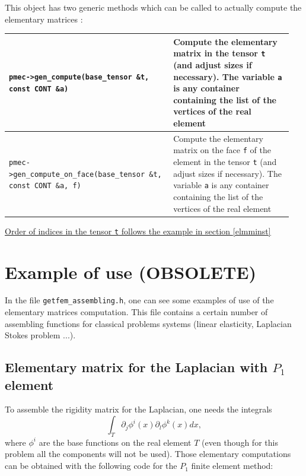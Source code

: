\documentclass[11pt,a4paper]{article}
\begin{document}
This object has two generic methods which can be called to actually compute the elementary matrices :

\begin{center} \begin{tabular}{|m{0.55\linewidth}|m{0.4\linewidth}|} \hline
{\tt pmec->gen\_compute(base\_tensor \&t, const CONT \&a)} & Compute the elementary matrix in the tensor {\tt t} (and adjust sizes if necessary). The variable {\tt a} is any container containing the list of the vertices of the real element\\ \hline
{\tt pmec->gen\_compute\_on\_face(base\_tensor \&t, const CONT \&a, f)} & Compute the elementary matrix on the face {\tt f} of the element in the tensor {\tt t} (and adjust sizes if necessary). The variable {\tt a} is any container containing the list of the vertices of the real element\\ \hline
\end{tabular} \end{center}

\underline{Order of indices in the tensor {\tt t} follows the example in section \ref{elmminst}}

\section{Example of use (OBSOLETE)}
In the file {\tt getfem\_assembling.h}, one can see some examples of use of the elementary matrices computation. This file contains a certain number of assembling functions for classical problems systems (linear elasticity, Laplacian Stokes problem ...).

\subsection{Elementary matrix for the Laplacian with $P_1$ element}

To assemble the rigidity matrix for the Laplacian, one needs the integrals
$$ \int_T \partial_j \phi^i(x) \partial_l \phi^k(x) dx, $$
where $\phi^i$ are the base functions on the real element $T$ (even though for this problem all the components will not be used). Those elementary computations can be obtained with the following code for the $P_1$ finite element method:
\end{document}

